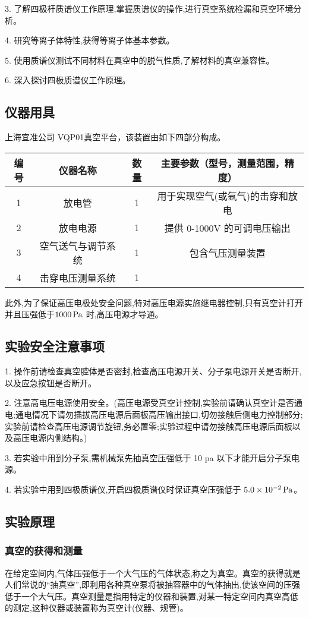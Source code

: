 \documentclass{ctexart}
\begin{document}
3. 了解四极杆质谱仪工作原理,掌握质谱仪的操作,进行真空系统检漏和真空环境分
析。

4. 研究等离子体特性,获得等离子体基本参数。

5. 使用质谱仪测试不同材料在真空中的脱气性质,了解材料的真空兼容性。

6. 深入探讨四极质谱仪工作原理。
\subsection{仪器用具}
上海宜准公司 VQP01真空平台，该装置由如下四部分构成。

\begin{tabular}{c|c|c|c}
	\hline
        编号 & 仪器名称 &数量& 主要参数（型号，测量范围，精度） \\
	\hline 
	1 &  放电管&1 & 用于实现空气(或氩气)的击穿和放电\\
        2 &  放电电源&1 &提供 0-1000V 的可调电压输出\\
        3 &  空气送气与调节系统&1& 包含气压测量装置\\
        4 &  击穿电压测量系统 &1&\\
	\hline
\end{tabular}

此外,为了保证高压电极处安全问题,特对高压电源实施继电器控制,只有真空计打开并且压强低于$1000\,\mathrm{Pa}$ 时,高压电源才导通。
\subsection{实验安全注意事项}

1. 操作前请检查真空腔体是否密封,检查高压电源开关、分子泵电源开关是否断开,以及应急按钮是否断开。

2. 注意高电压电源使用安全。(高压电源受真空计控制,实验前请确认真空计是否通电;通电情况下请勿插拔高压电源后面板高压输出接口,切勿接触后侧电力控制部分;实验前请检查高压电源调节旋钮,务必置零;实验过程中请勿接触高压电源后面板以及高压电源内侧结构。)

3. 若实验中用到分子泵,需机械泵先抽真空压强低于 10 pa 以下才能开启分子泵电源。

4. 若实验中用到四极质谱仪,开启四极质谱仪时保证真空压强低于 $5.0\times 10^{-2}\,\mathrm{Pa}$。

\subsection{实验原理}
\subsubsection{真空的获得和测量}
在给定空间内,气体压强低于一个大气压的气体状态,称之为真空。真空的获得就是人们常说的“抽真空”,即利用各种真空泵将被抽容器中的气体抽出,使该空间的压强低于一个大气压。真空测量是指用特定的仪器和装置,对某一特定空间内真空高低的测定,这种仪器或装置称为真空计(仪器、规管)。
\end{document}
